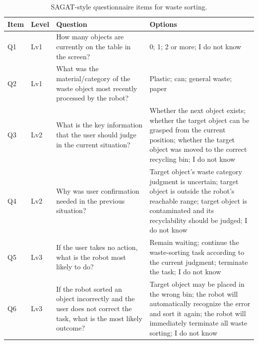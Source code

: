 \begin{table}[t]
\centering
\caption{SAGAT-style questionnaire items for waste sorting.}
\label{tab:app_sagat_waste_questions}
\scriptsize
\setlength{\tabcolsep}{3pt}
\begin{tabularx}{\textwidth}{p{}p{}p{}X}
\toprule
\textbf{Item} & \textbf{Level} & \textbf{Question} & \textbf{Options} \\
\midrule
Q1 & Lv1 & How many objects are currently on the table in the screen? & 0; 1; 2 or more; I do not know \\
Q2 & Lv1 & What was the material/category of the waste object most recently processed by the robot? & Plastic; can; general waste; paper \\
Q3 & Lv2 & What is the key information that the user should judge in the current situation? & Whether the next object exists; whether the target object can be grasped from the current position; whether the target object was moved to the correct recycling bin; I do not know \\
Q4 & Lv2 & Why was user confirmation needed in the previous situation? & Target object's waste category judgment is uncertain; target object is outside the robot's reachable range; target object is contaminated and its recyclability should be judged; I do not know \\
Q5 & Lv3 & If the user takes no action, what is the robot most likely to do? & Remain waiting; continue the waste-sorting task according to the current judgment; terminate the task; I do not know \\
Q6 & Lv3 & If the robot sorted an object incorrectly and the user does not correct the task, what is the most likely outcome? & Target object may be placed in the wrong bin; the robot will automatically recognize the error and sort it again; the robot will immediately terminate all waste sorting; I do not know \\
\bottomrule
\end{tabularx}
\end{table}

